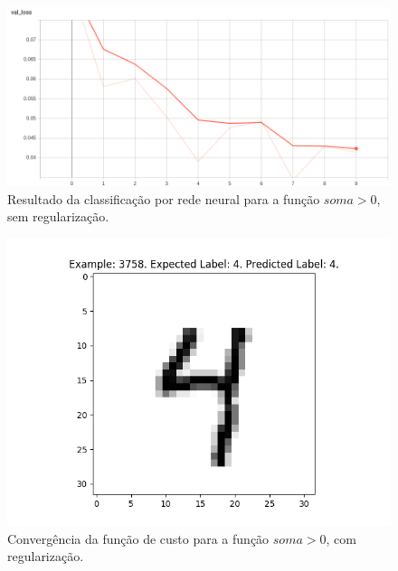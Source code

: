 \documentclass[conference]{IEEEtran}
\begin{document}
\begin{figure}[htbp]
\centering
\centerline{\includegraphics[scale=0.25]{imagens/val_loss.png}}
\caption{Resultado da classificação por rede neural para a função $soma > 0$, sem regularização.}
\label{val_loss}
\end{figure}

\begin{figure}[htbp]
\centering
\centerline{\includegraphics[scale=0.5]{imagens/test_image_3758.png}}
\caption{Convergência da função de custo para a função $soma > 0$, com regularização.}
\label{test_image_3758}
\end{figure}
\end{document}

